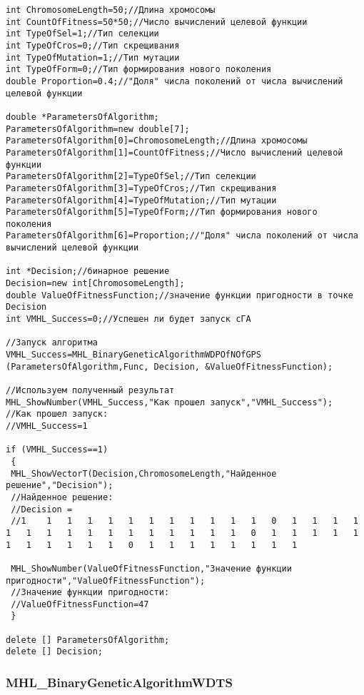 \documentclass[a4paper,12pt]{article}
\begin{document}
\begin{lstlisting}[label=code_use_MHL_BinaryGeneticAlgorithmWDPOfNOfGPS,caption=Пример использования]
int ChromosomeLength=50;//Длина хромосомы
int CountOfFitness=50*50;//Число вычислений целевой функции
int TypeOfSel=1;//Тип селекции
int TypeOfCros=0;//Тип скрещивания
int TypeOfMutation=1;//Тип мутации
int TypeOfForm=0;//Тип формирования нового поколения
double Proportion=0.4;//"Доля" числа поколений от числа вычислений целевой функции

double *ParametersOfAlgorithm;
ParametersOfAlgorithm=new double[7];
ParametersOfAlgorithm[0]=ChromosomeLength;//Длина хромосомы
ParametersOfAlgorithm[1]=CountOfFitness;//Число вычислений целевой функции
ParametersOfAlgorithm[2]=TypeOfSel;//Тип селекции
ParametersOfAlgorithm[3]=TypeOfCros;//Тип скрещивания
ParametersOfAlgorithm[4]=TypeOfMutation;//Тип мутации
ParametersOfAlgorithm[5]=TypeOfForm;//Тип формирования нового поколения
ParametersOfAlgorithm[6]=Proportion;//"Доля" числа поколений от числа вычислений целевой функции

int *Decision;//бинарное решение
Decision=new int[ChromosomeLength];
double ValueOfFitnessFunction;//значение функции пригодности в точке Decision
int VMHL_Success=0;//Успешен ли будет запуск cГА

//Запуск алгоритма
VMHL_Success=MHL_BinaryGeneticAlgorithmWDPOfNOfGPS (ParametersOfAlgorithm,Func, Decision, &ValueOfFitnessFunction);

//Используем полученный результат
MHL_ShowNumber(VMHL_Success,"Как прошел запуск","VMHL_Success");
//Как прошел запуск:
//VMHL_Success=1

if (VMHL_Success==1)
 {
 MHL_ShowVectorT(Decision,ChromosomeLength,"Найденное решение","Decision");
 //Найденное решение:
 //Decision =
 //1	1	1	1	1	1	1	1	1	1	1	1	0	1	1	1	1	1	1	1	1	1	1	1	1	1	1	1	1	0	1	1	1	1	1	1	1	1	1	1	1	0	1	1	1	1	1	1	1	1

 MHL_ShowNumber(ValueOfFitnessFunction,"Значение функции пригодности","ValueOfFitnessFunction");
 //Значение функции пригодности:
 //ValueOfFitnessFunction=47
 }

delete [] ParametersOfAlgorithm;
delete [] Decision;
\end{lstlisting}

\subsubsection{MHL\_BinaryGeneticAlgorithmWDTS}\label{MHL_BinaryGeneticAlgorithmWDTS}
\end{document}
